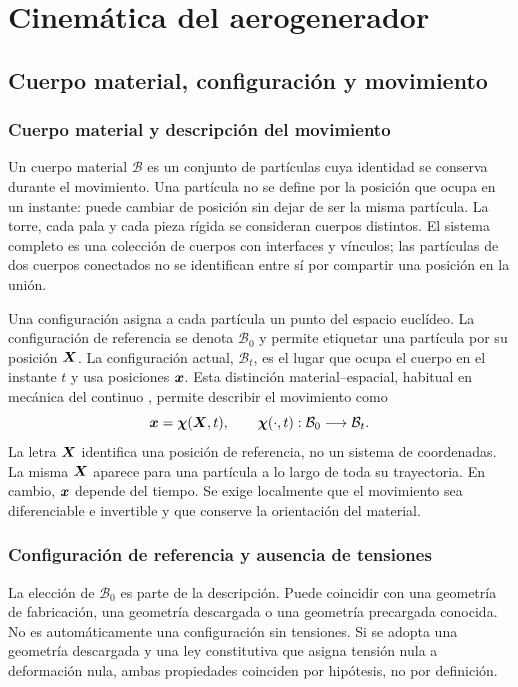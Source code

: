 \chapter{Cinemática del aerogenerador}
\label{ch:cinematica}
\section{Cuerpo material, configuración y movimiento}
\subsection{Cuerpo material y descripción del movimiento}
Un cuerpo material $\mathcal B$ es un conjunto de partículas cuya identidad se conserva durante el movimiento. Una partícula no se define por la posición que ocupa en un instante: puede cambiar de posición sin dejar de ser la misma partícula. La torre, cada pala y cada pieza rígida se consideran cuerpos distintos. El sistema completo es una colección de cuerpos con interfaces y vínculos; las partículas de dos cuerpos conectados no se identifican entre sí por compartir una posición en la unión.

Una configuración asigna a cada partícula un punto del espacio euclídeo. La configuración de referencia se denota $\mathcal B_0$ y permite etiquetar una partícula por su posición $\bm{X}$. La configuración actual, $\mathcal B_t$, es el lugar que ocupa el cuerpo en el instante $t$ y usa posiciones $\bm{x}$. Esta distinción material--espacial, habitual en mecánica del continuo \cite{holzapfel}, permite describir el movimiento como
\begin{equation}
 \bm{x}=\bm{\chi}(\bm{X},t),\qquad
 \bm{\chi}(\cdot,t):\mathcal B_0\longrightarrow\mathcal B_t.
 \label{eq:chi}
\end{equation}
La letra $\bm{X}$ identifica una posición de referencia, no un sistema de coordenadas. La misma $\bm{X}$ aparece para una partícula a lo largo de toda su trayectoria. En cambio, $\bm{x}$ depende del tiempo. Se exige localmente que el movimiento sea diferenciable e invertible y que conserve la orientación del material.

\subsection{Configuración de referencia y ausencia de tensiones}
La elección de $\mathcal B_0$ es parte de la descripción. Puede coincidir con una geometría de fabricación, una geometría descargada o una geometría precargada conocida. No es automáticamente una configuración sin tensiones. Si se adopta una geometría descargada y una ley constitutiva que asigna tensión nula a deformación nula, ambas propiedades coinciden por hipótesis, no por definición.

